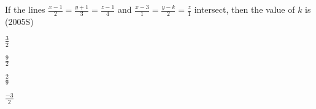 \item If the lines $\frac{x-1}{2}=\frac{y+1}{3}=\frac{z-1}{4}$ and $\frac{x-3}{1}=\frac{y-k}{2}=\frac{z}{1}$ intersect, then the value of $k$ is 
\hfill (2005S)
\begin{enumerate}
\begin{multicols}{4}
    \item $\frac{3}{2}$
    \item $\frac{9}{2}$
    \item $\frac{2}{9}$
    \item $\frac{-3}{2}$
\end{multicols}
\end{enumerate}


%



























            
